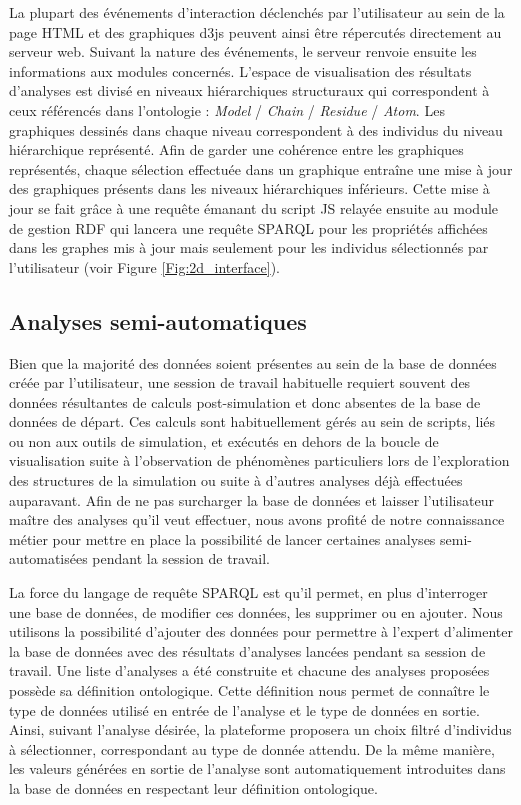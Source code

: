 La plupart des événements d'interaction déclenchés par l'utilisateur au sein de la page HTML et des graphiques d3js peuvent ainsi être répercutés directement au serveur web. Suivant la nature des événements, le serveur renvoie ensuite les informations aux modules concernés.
L'espace de visualisation des résultats d'analyses est divisé en niveaux hiérarchiques structuraux qui correspondent à ceux référencés dans l'ontologie : \textit{Model} / \textit{Chain} / \textit{Residue} / \textit{Atom}. Les graphiques dessinés dans chaque niveau correspondent à des individus du niveau hiérarchique représenté. Afin de garder une cohérence entre les graphiques représentés, chaque sélection effectuée dans un graphique entraîne une mise à jour des graphiques présents dans les niveaux hiérarchiques inférieurs. Cette mise à jour se fait grâce à une requête émanant du script JS relayée ensuite au module de gestion RDF qui lancera une requête SPARQL pour les propriétés affichées dans les graphes mis à jour mais seulement pour les individus sélectionnés par l'utilisateur (voir Figure \ref{Fig:2d_interface}).



\subsection{Analyses semi-automatiques}

Bien que la majorité des données soient présentes au sein de la base de données créée par l'utilisateur, une session de travail habituelle requiert souvent des données résultantes de calculs post-simulation et donc absentes de la base de données de départ. Ces calculs sont habituellement gérés au sein de scripts, liés ou non aux outils de simulation, et exécutés en dehors de la boucle de visualisation suite à l'observation de phénomènes particuliers lors de l'exploration des structures de la simulation ou suite à d'autres analyses déjà effectuées auparavant. Afin de ne pas surcharger la base de données et laisser l'utilisateur maître des analyses qu'il veut effectuer, nous avons profité de notre connaissance métier pour mettre en place la possibilité de lancer certaines analyses semi-automatisées pendant la session de travail. 

La force du langage de requête SPARQL est qu'il permet, en plus d'interroger une base de données, de modifier ces données, les supprimer ou en ajouter. Nous utilisons la possibilité d'ajouter des données pour permettre à l'expert d'alimenter la base de données avec des résultats d'analyses lancées pendant sa session de travail. Une liste d'analyses a été construite et chacune des analyses proposées possède sa définition ontologique. Cette définition nous permet de connaître le type de données utilisé en entrée de l'analyse et le type de données en sortie. Ainsi, suivant l'analyse désirée, la plateforme proposera un choix filtré d'individus à sélectionner, correspondant au type de donnée attendu. De la même manière, les valeurs générées en sortie de l'analyse sont automatiquement introduites dans la base de données en respectant leur définition ontologique.

